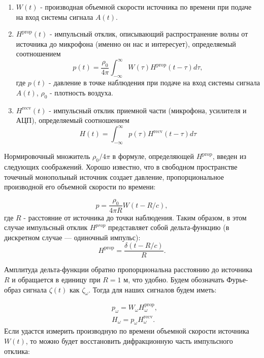 \begin{enumerate}
	\item $W(t)$ - производная объемной скорости источника по времени при подаче на вход системы сигнала $A(t)$.
	\item $H^{\text{prop}}(t)$ - импульсный отклик, описывающий распространение волны от источника до микрофона (именно он нас и интересует), определяемый соотношением
	\begin{equation}
	p(t) = \frac{\rho_0}{4\pi} \int_{-\infty}^{\infty} W(\tau) H^{\text{prop}}(t-\tau) d\tau,
	\end{equation}
	где $p(t)$ - давление в точке наблюдения при подаче на вход системы сигнала $A(t)$, $\rho_0$ - плотность воздуха.
	\item $H^{\text{recv}}(t)$ - импульсный отклик приемной части (микрофона, усилителя и АЦП), определяемый соотношением
	\begin{equation}
	H(t) = \int_{-\infty}^{\infty} p(\tau) H^{\text{recv}}(t-\tau)d\tau
	\end{equation}
\end{enumerate}

Нормировочный множитель $\rho_0/4\pi$ в формуле, определяющей $H^{\text{prop}}$, введен из следующих соображений. Хорошо известно, что в свободном пространстве точечный монопольный источник создает давление, пропорциональное производной его объемной скорости по времени:

\begin{equation}
p = \frac{\rho_0}{4\pi R} W(t-R/c),
\end{equation}
где $R$ - расстояние от источника до точки наблюдения. Таким образом, в этом случае импульсный отклик $H^{prop}$ представляет собой дельта-функцию (в дискретном случае — одиночный импульс):
\begin{equation}
H^{\text{prop}} = \frac{\delta(t-R/c)}{R}.
\end{equation}

Амплитуда дельта-функции обратно пропорциональна расстоянию до источника $R$ и обращается в единицу при $R = 1$ м, что удобно.
Будем обозначать Фурье-образ сигнала $\zeta(t)$ как $\zeta_\omega$. Тогда для наших сигналов будем иметь:

\begin{eqnarray}
&p_\omega = W_\omega H_\omega^{\text{prop}},\\
&H_\omega = p_\omega H_\omega^{\text{recv}}.
\end{eqnarray}
Если удастся измерить производную по времени объемной скорости источника $W(t)$, то можно будет восстановить дифракционную часть импульсного отклика:

